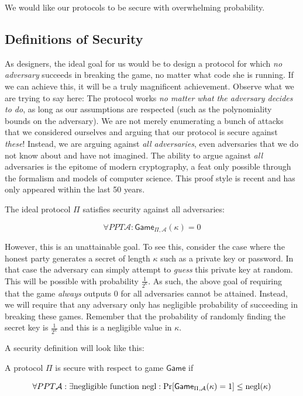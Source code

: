 We would like our protocols to be secure with overwhelming probability.

\subsection*{Definitions of Security}

As designers, the ideal goal for us would be to design a protocol for which \emph{no adversary}
succeeds in breaking the game, no matter what code she is running. If we can achieve this, it
will be a truly magnificent achievement. Observe what we are trying to say here: The protocol
works \emph{no matter what the adversary decides to do}, as long as our assumptions are respected
(such as the polynomiality bounds on the adversary).
We are not merely enumerating a bunch of attacks that we considered ourselves and arguing that
our protocol is secure against \emph{these}!
Instead, we are arguing against \emph{all adversaries}, even adversaries that we do
not know about and have not imagined. The ability to argue against \emph{all} adversaries is the
epitome of modern cryptography, a feat only possible through the
formalism and models of computer science. This proof style is recent and has only appeared within
the last 50 years.

The ideal protocol $\Pi$ satisfies security against all adversaries:

\[
  \forall PPT \mathcal{A}: \textsf{Game}_{\Pi,\mathcal{A}}(\kappa) = 0
\]

However, this is an unattainable goal. To see this, consider the case where the honest party
generates a secret of length $\kappa$ such as a private key or password. In that case the
adversary can simply attempt to \emph{guess} this private key at random. This will be possible
with probability $\frac{1}{2^\kappa}$. As such, the above goal of requiring that the game
\emph{always} outputs $0$ for all adversaries cannot be attained. Instead, we will require
that any adversary only has negligible probability of succeeding in breaking these games.
Remember that the probability of randomly finding the secret key is $\frac{1}{2^\kappa}$
and this is a negligible value in $\kappa$.

A security definition will look like this:

\begin{definition}[Security]
  A protocol $\Pi$ is secure with respect to game $\textsf{Game}$ if

  \[
    \forall PPT \mathcal{A}: \exists \text{negligible function } \mathrm{negl}:
    \Pr[\textsf{Game}_{\Pi,\mathcal{A}}(\kappa) = 1] \leq \mathrm{negl}(\kappa)
  \]
\end{definition}

